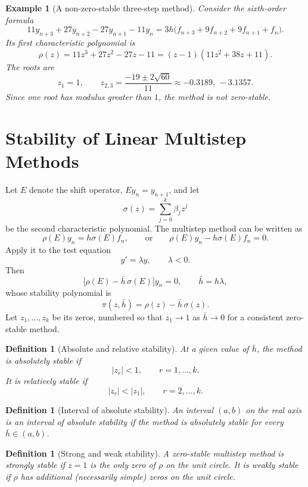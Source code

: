 \documentclass[11pt,a4paper]{article}
\numberwithin{equation}{section}
\theoremstyle{spacedplain}
\theoremstyle{spaceddefinition}
\newtheorem{definition}[theorem]{Definition}
\newtheorem{example}[theorem]{Example}
\theoremstyle{spacedremark}
\begin{document}
\begin{example}[A non-zero-stable three-step method]
Consider the sixth-order formula
\[
  11y_{n+3}+27y_{n+2}-27y_{n+1}-11y_n
  =3h\bigl(f_{n+3}+9f_{n+2}+9f_{n+1}+f_n\bigr).
\]
Its first characteristic polynomial is
\[
  \rho(z)=11z^3+27z^2-27z-11
  =(z-1)(11z^2+38z+11).
\]
The roots are
\[
  z_1=1,\qquad
  z_{2,3}=\frac{-19\pm2\sqrt{60}}{11}
  \approx-0.3189,\,-3.1357.
\]
Since one root has modulus greater than \(1\), the method is not
zero-stable.
\end{example}

\section{Stability of Linear Multistep Methods}

Let \(E\) denote the shift operator, \(E y_n=y_{n+1}\), and let
\[
  \sigma(z)=\sum_{j=0}^{k}\beta_jz^j
\]
be the second characteristic polynomial.  The multistep method can be
written as
\[
  \rho(E)y_n=h\sigma(E)f_n,
  \qquad\text{or}\qquad
  \rho(E)y_n-h\sigma(E)f_n=0.
\]
Apply it to the test equation
\[
  y'=\lambda y,\qquad \lambda<0.
\]
Then
\[
  \bigl[\rho(E)-\bar h\,\sigma(E)\bigr]y_n=0,
  \qquad \bar h=h\lambda,
\]
whose stability polynomial is
\[
  \pi(z,\bar h)=\rho(z)-\bar h\,\sigma(z).
\]
Let \(z_1,\ldots,z_k\) be its zeros, numbered so that \(z_1\to1\) as
\(\bar h\to0\) for a consistent zero-stable method.

\begin{definition}[Absolute and relative stability]
At a given value of \(\bar h\), the method is \emph{absolutely stable}
if
\[
  |z_r|<1,\qquad r=1,\ldots,k.
\]
It is \emph{relatively stable} if
\[
  |z_r|<|z_1|,\qquad r=2,\ldots,k.
\]
\end{definition}

\begin{definition}[Interval of absolute stability]
An interval \((a,b)\) on the real axis is an interval of absolute
stability if the method is absolutely stable for every
\(\bar h\in(a,b)\).
\end{definition}

\begin{definition}[Strong and weak stability]
A zero-stable multistep method is \emph{strongly stable} if \(z=1\) is
the only zero of \(\rho\) on the unit circle.  It is \emph{weakly
stable} if \(\rho\) has additional (necessarily simple) zeros on the
unit circle.
\end{definition}
\end{document}
